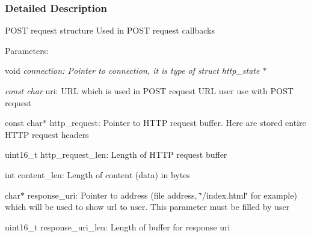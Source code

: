 \subsubsection{Detailed Description}
P\+O\+S\+T request structure Used in P\+O\+S\+T request callbacks

Parameters\+:
\begin{DoxyItemize}
\item void {\itshape connection\+: Pointer to connection, it is type of struct http\+\_\+state $\ast$}
\item {\itshape const char} uri\+: U\+R\+L which is used in P\+O\+S\+T request U\+R\+L user use with P\+O\+S\+T request
\item const char$\ast$ http\+\_\+request\+: Pointer to H\+T\+T\+P request buffer. Here are stored entire H\+T\+T\+P request headers
\item uint16\+\_\+t http\+\_\+request\+\_\+len\+: Length of H\+T\+T\+P request buffer
\item int content\+\_\+len\+: Length of content (data) in bytes
\item char$\ast$ response\+\_\+uri\+: Pointer to address (file address, \char`\"{}/index.\+html\char`\"{} for example) which will be used to show url to user. This parameter must be filled by user
\item uint16\+\_\+t response\+\_\+uri\+\_\+len\+: Length of buffer for response uri 
\end{DoxyItemize}
